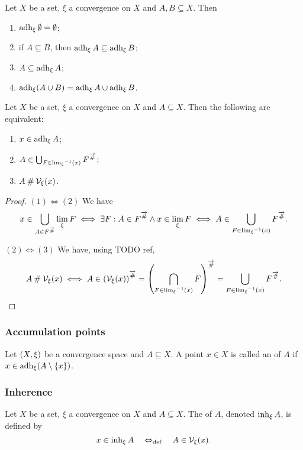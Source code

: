 \begin{proposition}
Let $X$ be a set, $\xi$ a convergence on $X$ and $A,B \subseteq X$. Then
\begin{enumerate}
\item $\operatorname{adh}_\xi \emptyset = \emptyset$;
\item if $A \subseteq B$, then $\operatorname{adh}_\xi A \subseteq \operatorname{adh}_\xi B$;
\item $A\subseteq \operatorname{adh}_\xi A$;
\item $\operatorname{adh}_\xi(A\cup B) = \operatorname{adh}_\xi A \cup \operatorname{adh}_\xi B$.
\end{enumerate}
\end{proposition}

\begin{proposition}
Let $X$ be a set, $\xi$ a convergence on $X$ and $A \subseteq X$. Then the following are equivalent:
\begin{enumerate}
\item $x\in \operatorname{adh}_\xi A$;
\item $A\in \bigcup_{F\in {\lim_\xi}^{-1}(x)} F^{\overrightarrow{\mathbin{\#}}}$;
\item $A \mathbin{\#} \mathcal{V}_\xi(x)$.
\end{enumerate}
\end{proposition}
\begin{proof}
$(1) \Leftrightarrow (2)$ We have
\[ x\in \bigcup_{A\in F^{\overrightarrow{\mathbin{\#}}}}\lim_\xi F \iff \exists F: A \in F^{\overrightarrow{\mathbin{\#}}} \land x\in \lim_\xi F \iff A\in  \bigcup_{F\in {\lim_\xi}^{-1}(x)} F^{\overrightarrow{\mathbin{\#}}}. \]

$(2) \Leftrightarrow (3)$ We have, using TODO ref,
\[ A \mathbin{\#} \mathcal{V}_\xi(x) \iff A\in \left(\mathcal{V}_\xi(x)\right)^{\overrightarrow{\mathbin{\#}}} = \left(\bigcap_{F\in {\lim_\xi}^{-1}(x)}F\right)^{\overrightarrow{\mathbin{\#}}} = \bigcup_{F\in {\lim_\xi}^{-1}(x)} F^{\overrightarrow{\mathbin{\#}}}. \]
\end{proof}

\subsubsection{Accumulation points}
\begin{definition}
Let $\left( X,\xi \right)$ be a convergence space and $A\subseteq X$. A point $x\in X$ is called an  of $A$ if $x\in \operatorname{adh}_\xi(A\setminus\{x\})$.
\end{definition}

\subsubsection{Inherence}
\begin{definition}
Let $X$ be a set, $\xi$ a convergence on $X$ and $A \subseteq X$. The  of $A$, denoted $\operatorname{inh}_\xi A$, is defined by
\[ x\in \operatorname{inh}_\xi A \quad\Leftrightarrow_{\text{def}}\quad A\in \mathcal{V}_\xi(x). \]
\end{definition}


